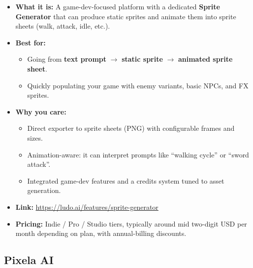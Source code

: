 \documentclass[11pt]{article}
\begin{document}
\begin{itemize}
    \item \textbf{What it is:} A game-dev-focused platform with a dedicated \textbf{Sprite Generator} that can produce static sprites and animate them into sprite sheets (walk, attack, idle, etc.).
    \item \textbf{Best for:}
    \begin{itemize}
        \item Going from \textbf{text prompt} $\rightarrow$ \textbf{static sprite} $\rightarrow$ \textbf{animated sprite sheet}.
        \item Quickly populating your game with enemy variants, basic NPCs, and FX sprites.
    \end{itemize}
    \item \textbf{Why you care:}
    \begin{itemize}
        \item Direct exporter to sprite sheets (PNG) with configurable frames and sizes.
        \item Animation-aware: it can interpret prompts like ``walking cycle'' or ``sword attack''.
        \item Integrated game-dev features and a credits system tuned to asset generation.
    \end{itemize}
    \item \textbf{Link:} \url{https://ludo.ai/features/sprite-generator}
    \item \textbf{Pricing:} Indie / Pro / Studio tiers, typically around mid two-digit USD per month depending on plan, with annual-billing discounts.
\end{itemize}

\subsection{Pixela AI}
\end{document}
